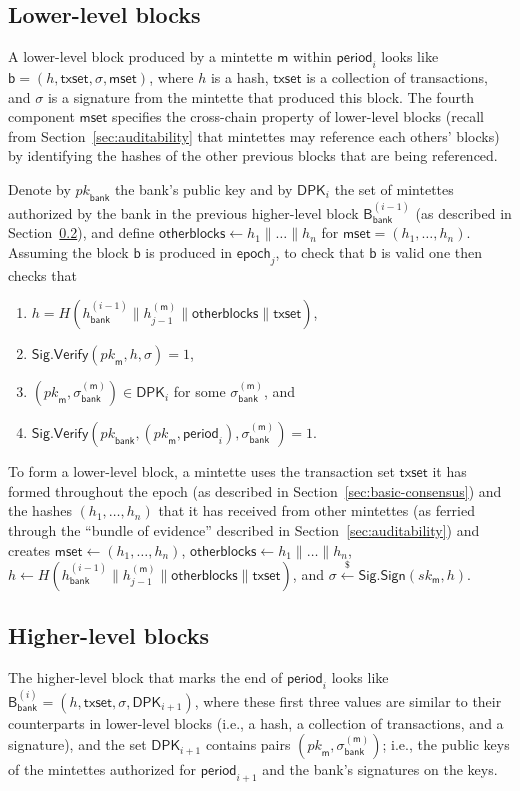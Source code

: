 \documentclass[conference]{IEEEtran}
\newcommand\ben{\begin{enumerate}}
\newcommand\een{\end{enumerate}}
\newcommand{\randpick}{\xleftarrow{\$}}
\newcommand{\pk}{{\ensuremath{pk}}}
\newcommand{\sk}{{\ensuremath{sk}}}
\newcommand{\sig}{{\ensuremath{\sigma}}}
\newcommand{\sigsign}{\mathsf{Sig.Sign}}
\newcommand{\sigverify}{\mathsf{Sig.Verify}}
\newcommand{\block}{\mathsf{b}}
\newcommand{\centralblock}{\mathsf{B}}
\newcommand{\period}{\mathsf{period}}
\newcommand{\epoch}{\mathsf{epoch}}
\newcommand{\bank}{\mathsf{bank}}
\newcommand{\mintette}{\mathsf{m}}
\newcommand{\txset}{\mathsf{txset}}
\newcommand{\periodmintette}[1]{\mathsf{DPK}_{{#1}}}
\newcommand{\mintettesig}{\sig_\bank^{(\mintette)}}
\newcommand{\mintetteset}{\mathsf{mset}}
\newcommand{\centralblockspec}[2]{\centralblock_{{#1}}^{(#2)}}
\newcommand{\otherblocks}{\mathsf{otherblocks}}
\begin{document}
\subsection{Lower-level blocks}\label{sec:low-blocks}

A lower-level block produced by a mintette $\mintette$ within $\period_i$
looks like $\block = (h,\txset,\sig,\mintetteset)$,
where $h$ is a hash, $\txset$ is a collection of transactions, and
$\sig$ is a signature from the mintette that produced this block.  The fourth
component $\mintetteset$ specifies the cross-chain property of lower-level
blocks (recall from Section~\ref{sec:auditability} that mintettes may
reference each others' blocks) by identifying the hashes of the other previous
blocks that are being referenced.

Denote by $\pk_\bank$ the bank's public key and by $\periodmintette{i}$ the
set of mintettes authorized by the bank in the previous higher-level block
$\centralblockspec{\bank}{i-1}$
(as described in Section~\ref{sec:high-blocks}), and define
$\otherblocks \gets h_1\|\ldots\| h_n$ for $\mintetteset = (h_1,\ldots,h_n)$.
Assuming the block $\block$ is produced in $\epoch_j$, to check that $\block$
is valid one then checks that
\ben
\item $h = H(h_{\bank}^{(i-1)}\|h_{j-1}^{(\mintette)}
    \|\otherblocks\|\txset)$,
\item $\sigverify(\pk_\mintette,h,\sig)=1$,
\item $(\pk_\mintette,\mintettesig)\in\periodmintette{i}$ for some
$\mintettesig$, and
\item $\sigverify(\pk_\bank,(\pk_\mintette,\period_i),\mintettesig)=1$.
\een

To form a lower-level block, a mintette uses the transaction set $\txset$ it
has formed throughout the epoch (as described in
Section~\ref{sec:basic-consensus}) and the hashes $(h_1,\ldots,h_n)$ that it
has
received from other mintettes (as ferried through the ``bundle of evidence''
described in Section~\ref{sec:auditability})
and creates $\mintetteset\gets(h_1,\ldots,h_n)$,
$\otherblocks\gets h_1\|\ldots\| h_n$,
$h\gets H(h_{\bank}^{(i-1)}
\| h_{j-1}^{(\mintette)}\|\otherblocks\|\txset)$,
and $\sig\randpick\sigsign(\sk_\mintette,h)$.

\subsection{Higher-level blocks}\label{sec:high-blocks}

The higher-level block that marks the end of $\period_i$ looks like
$\centralblockspec{\bank}{i} = (h,\txset,\allowbreak\sig,
\periodmintette{i+1})$, where these first three
values are similar to their counterparts in lower-level blocks (i.e., a hash,
a collection of transactions, and a signature), and the set
$\periodmintette{i+1}$
contains pairs $(\pk_\mintette,\mintettesig)$; i.e., the public
keys of the mintettes authorized for $\period_{i+1}$ and the bank's
signatures on the keys.
\end{document}
